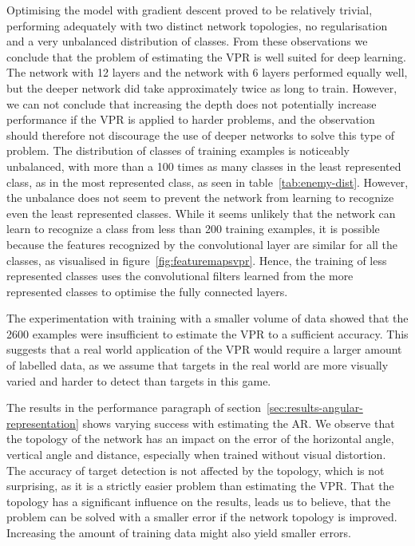 Optimising the model with gradient descent proved to be relatively trivial, performing adequately with two distinct network topologies, no regularisation and a very unbalanced distribution of classes. From these observations we conclude that the problem of estimating the VPR is well suited for deep learning. The network with 12 layers and the network with 6 layers performed equally well, but the deeper network did take approximately twice as long to train. However, we can not conclude that increasing the depth does not potentially increase performance if the VPR is applied to harder problems, and the observation should therefore not discourage the use of deeper networks to solve this type of problem. The distribution of classes of training examples is noticeably unbalanced, with more than a 100 times as many classes in the least represented class, as in the most represented class, as seen in table~\ref{tab:enemy-dist}. However, the unbalance does not seem to prevent the network from learning to recognize even the least represented classes. While it seems unlikely that the network can learn to recognize a class from less than 200 training examples, it is possible because the features recognized by the convolutional layer are similar for all the classes, as visualised in figure~\ref{fig:featuremapsvpr}. Hence, the training of less represented classes uses the convolutional filters learned from the more represented classes to optimise the fully connected layers.

The experimentation with training with a smaller volume of data showed that the 2600 examples were insufficient to estimate the VPR to a sufficient accuracy. This suggests that a real world application of the VPR would require a larger amount of labelled data, as we assume that targets in the real world are more visually varied and harder to detect than targets in this game.

The results in the performance paragraph of section~\ref{sec:results-angular-representation} shows varying success with estimating the AR. We observe that the topology of the network has an impact on the error of the horizontal angle, vertical angle and distance, especially when trained without visual distortion. The accuracy of target detection is not affected by the topology, which is not surprising, as it is a strictly easier problem than estimating the VPR. That the topology has a significant influence on the results, leads us to believe, that the problem can be solved with a smaller error if the network topology is improved. Increasing the amount of training data might also yield smaller errors.

